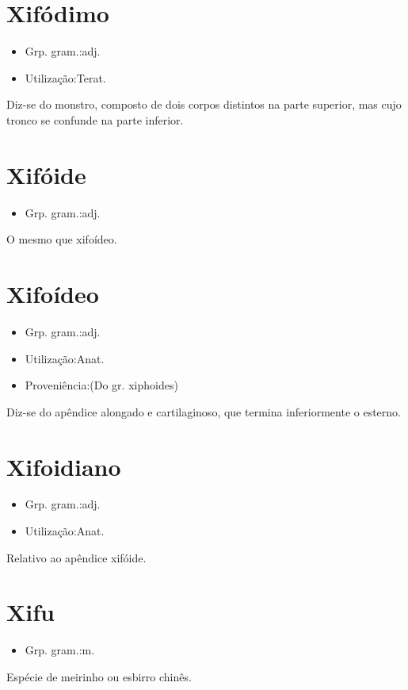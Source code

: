 \section{Xifódimo}
\begin{itemize}
\item {Grp. gram.:adj.}
\end{itemize}
\begin{itemize}
\item {Utilização:Terat.}
\end{itemize}
Diz-se do monstro, composto de dois corpos distintos na parte superior, mas cujo tronco se confunde na parte inferior.
\section{Xifóide}
\begin{itemize}
\item {Grp. gram.:adj.}
\end{itemize}
O mesmo que \textunderscore xifoídeo\textunderscore .
\section{Xifoídeo}
\begin{itemize}
\item {Grp. gram.:adj.}
\end{itemize}
\begin{itemize}
\item {Utilização:Anat.}
\end{itemize}
\begin{itemize}
\item {Proveniência:(Do gr. \textunderscore xiphoides\textunderscore )}
\end{itemize}
Diz-se do apêndice alongado e cartilaginoso, que termina inferiormente o esterno.
\section{Xifoidiano}
\begin{itemize}
\item {Grp. gram.:adj.}
\end{itemize}
\begin{itemize}
\item {Utilização:Anat.}
\end{itemize}
Relativo ao apêndice xifóide.
\section{Xifu}
\begin{itemize}
\item {Grp. gram.:m.}
\end{itemize}
Espécie de meirinho ou esbirro chinês.
